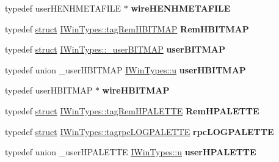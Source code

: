 \begin{DoxyCompactItemize}
\item 
\mbox{\label{interface_i_win_types_a4429431668928ce1b082a3f076ef5006}} 
typedef user\+H\+E\+N\+H\+M\+E\+T\+A\+F\+I\+LE $\ast$ {\bfseries wire\+H\+E\+N\+H\+M\+E\+T\+A\+F\+I\+LE}
\item 
\mbox{\label{interface_i_win_types_abf3662c2565d2bef3de2619afa664263}} 
typedef \hyperlink{interfacestruct}{struct} \hyperlink{struct_i_win_types_1_1tag_rem_h_b_i_t_m_a_p}{I\+Win\+Types\+::tag\+Rem\+H\+B\+I\+T\+M\+AP} {\bfseries Rem\+H\+B\+I\+T\+M\+AP}
\item 
\mbox{\label{interface_i_win_types_a68a4aebcfda267aa42046353cc4f9dc9}} 
typedef \hyperlink{interfacestruct}{struct} \hyperlink{struct_i_win_types_1_1__user_b_i_t_m_a_p}{I\+Win\+Types\+::\+\_\+user\+B\+I\+T\+M\+AP} {\bfseries user\+B\+I\+T\+M\+AP}
\item 
\mbox{\label{interface_i_win_types_a84c7dfca1757ed349deb4aed39685e42}} 
typedef union \+\_\+user\+H\+B\+I\+T\+M\+AP \hyperlink{union_i_win_types_1_1u}{I\+Win\+Types\+::u} {\bfseries user\+H\+B\+I\+T\+M\+AP}
\item 
\mbox{\label{interface_i_win_types_a2d95e20dbc686cd86d651f85ea909c74}} 
typedef user\+H\+B\+I\+T\+M\+AP $\ast$ {\bfseries wire\+H\+B\+I\+T\+M\+AP}
\item 
\mbox{\label{interface_i_win_types_a52994e7368306205941d7bd359b1e5d7}} 
typedef \hyperlink{interfacestruct}{struct} \hyperlink{struct_i_win_types_1_1tag_rem_h_p_a_l_e_t_t_e}{I\+Win\+Types\+::tag\+Rem\+H\+P\+A\+L\+E\+T\+TE} {\bfseries Rem\+H\+P\+A\+L\+E\+T\+TE}
\item 
\mbox{\label{interface_i_win_types_a84835fb2c4cf27768800f048e0e0a118}} 
typedef \hyperlink{interfacestruct}{struct} \hyperlink{struct_i_win_types_1_1tagrpc_l_o_g_p_a_l_e_t_t_e}{I\+Win\+Types\+::tagrpc\+L\+O\+G\+P\+A\+L\+E\+T\+TE} {\bfseries rpc\+L\+O\+G\+P\+A\+L\+E\+T\+TE}
\item 
\mbox{\label{interface_i_win_types_aa93f9726fb411e4ad2be1920fdc3a75a}} 
typedef union \+\_\+user\+H\+P\+A\+L\+E\+T\+TE \hyperlink{union_i_win_types_1_1u}{I\+Win\+Types\+::u} {\bfseries user\+H\+P\+A\+L\+E\+T\+TE}

\end{DoxyCompactItemize}
